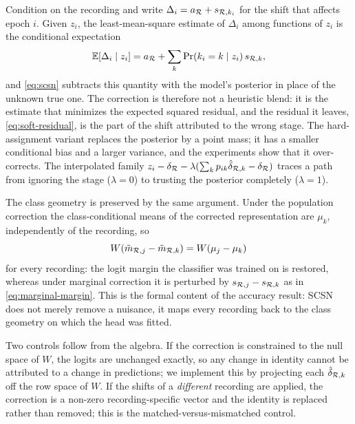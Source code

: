 \begin{remark}
\label{rem:mmse}
Condition on the recording and write $\Delta_i=a_{\mathcal{R}}+s_{\mathcal{R},k_i}$ for the
shift that affects epoch $i$. Given $z_i$, the least-mean-square estimate of
$\Delta_i$ among functions of $z_i$ is the conditional expectation
\begin{equation}
  \mathbb{E}[\Delta_i\mid z_i]=a_{\mathcal{R}}+\sum_k \Pr(k_i=k\mid z_i)\,s_{\mathcal{R},k},
  \label{eq:mmse}
\end{equation}
and \eqref{eq:scsn} subtracts this quantity with the model's posterior in place
of the unknown true one. The correction is therefore not a heuristic blend: it
is the estimate that minimizes the expected squared residual, and the residual
it leaves, \eqref{eq:soft-residual}, is the part of the shift attributed to the
wrong stage. The hard-assignment variant replaces the posterior by a point mass;
it has a smaller conditional bias and a larger variance, and the experiments
show that it over-corrects. The interpolated family
$z_i-\delta_{\mathcal{R}}-\lambda(\sum_k p_{ik}\hat\delta_{\mathcal{R},k}-\delta_{\mathcal{R}})$
traces a path from ignoring the stage ($\lambda=0$) to trusting the posterior
completely ($\lambda=1$).
\end{remark}

The class geometry is preserved by the same argument. Under the population
correction the class-conditional means of the corrected representation are
$\mu_k$, independently of the recording, so
\begin{equation}
  W\!\left(\tilde m_{\mathcal{R},j}-\tilde m_{\mathcal{R},k}\right)
  = W\!\left(\mu_j-\mu_k\right)
  \label{eq:scsn-margin}
\end{equation}
for every recording: the logit margin the classifier was trained on is
restored, whereas under marginal correction it is perturbed by
$s_{\mathcal{R},j}-s_{\mathcal{R},k}$ as in \eqref{eq:marginal-margin}. This is the formal
content of the accuracy result: SCSN does not merely remove a nuisance, it
maps every recording back to the class geometry on which the head was fitted.

Two controls follow from the algebra. If the correction is constrained to the
null space of $W$, the logits are unchanged exactly, so any change in identity
cannot be attributed to a change in predictions; we implement this by
projecting each $\hat\delta_{\mathcal{R},k}$ off the row space of $W$. If the shifts of
a \emph{different} recording are applied, the correction is a non-zero
recording-specific vector and the identity is replaced rather than removed;
this is the matched-versus-mismatched control.

